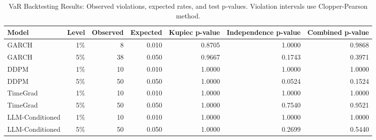 \begin{table}[htbp]
\centering
\begin{tabular}{lrrrrrr}
\toprule
Model & Level & Observed & Expected & Kupiec p-value & Independence p-value & Combined p-value \\
\midrule
GARCH & 1\% & 8 & 0.010 & 0.8705 & 1.0000 & 0.9868 \\
GARCH & 5\% & 38 & 0.050 & 0.9667 & 0.1743 & 0.3971 \\
DDPM & 1\% & 10 & 0.010 & 1.0000 & 1.0000 & 1.0000 \\
DDPM & 5\% & 50 & 0.050 & 1.0000 & 0.0524 & 0.1524 \\
TimeGrad & 1\% & 10 & 0.010 & 1.0000 & 1.0000 & 1.0000 \\
TimeGrad & 5\% & 50 & 0.050 & 1.0000 & 0.7540 & 0.9521 \\
LLM-Conditioned & 1\% & 10 & 0.010 & 1.0000 & 1.0000 & 1.0000 \\
LLM-Conditioned & 5\% & 50 & 0.050 & 1.0000 & 0.2699 & 0.5440 \\
\bottomrule
\end{tabular}
\caption{VaR Backtesting Results: Observed violations, expected rates, and test p-values. Violation intervals use Clopper-Pearson method.}
\label{tab:backtesting}
\end{table}